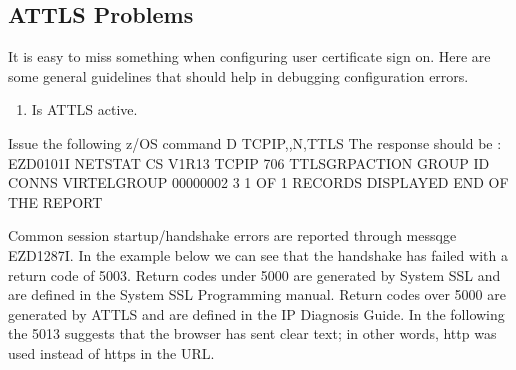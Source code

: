 \documentclass[letterpaper,10pt,english]{sphinxmanual}
\begin{document}
\ignorespaces 

\subsection{AT\sphinxhyphen{}TLS Problems}
\label{\detokenize{Customization:at-tls-problems}}\label{\detokenize{Customization:index-114}}
\sphinxAtStartPar
It is easy to miss something when configuring user certificate sign on. Here are some general guidelines that should help in debugging configuration errors.
\begin{enumerate}
%
\item {} 
\sphinxAtStartPar
Is AT\sphinxhyphen{}TLS active.

\end{enumerate}

\begin{sphinxVerbatim}[commandchars=\\\{\}]
Issue the following z/OS command \textendash{} D TCPIP,,N,TTLS
The response should be :
    EZD0101I NETSTAT CS V1R13 TCPIP 706
    TTLSGRPACTION GROUP ID CONNS
    VIRTELGROUP 00000002 3
    1 OF 1 RECORDS DISPLAYED
    END OF THE REPORT
\end{sphinxVerbatim}
\begin{description}
\sphinxAtStartPar
Common session startup/handshake errors are reported through messqge EZD1287I. In the example below we can see that the handshake has failed with a return code of 5003. Return codes under 5000 are generated by System SSL and are defined in the System SSL Programming manual. Return codes over 5000 are generated by AT\sphinxhyphen{}TLS and are defined in the IP Diagnosis Guide. In the following the 5013 suggests that the browser has sent clear text; in other words, http was used instead of https in the URL.

\end{description}
\end{document}
